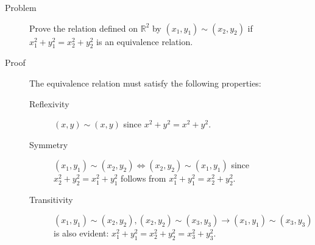 \begin{description}
\item[Problem] Prove the relation defined on $\mathbb{R}^2$ by $(x_1, y_1)
\sim (x_2, y_2)$ if $x_1^2 + y_1^2 = x_2^2 + y_2^2$ is an equivalence
relation.
\item[Proof] The equivalence relation must satisfy the following properties:
\begin{description}
        \item[Reflexivity] $(x, y) \sim (x, y)$ since $x^2 + y^2 = x^2 + y^2$.
        \item[Symmetry] $(x_1, y_1) \sim (x_2, y_2) \iff (x_2, y_2) \sim
                (x_1, y_1)$ since $x_2^2 + y_2^2 = x_1^2 + y_1^2$ follows from
                $x_1^2 + y_1^2 = x_2^2 + y_2^2$.
        \item[Transitivity] $(x_1, y_1) \sim (x_2, y_2), (x_2, y_2) \sim
                (x_3, y_3) \rightarrow (x_1, y_1) \sim (x_3, y_3)$ is also
                evident: $x_1^2 + y_1^2 = x_2^2 + y_2^2 = x_3^2 + y_3^2$.
\end{description}
\end{description}
